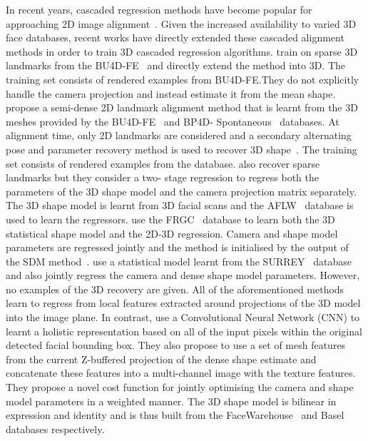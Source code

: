 In recent years, cascaded regression methods have become popular for approaching
2D image alignment~\cite{xiong2013supervised,cao2014face,ren2014face,kazemi2014one}.
Given the increased availability to varied 3D face databases, recent works have
directly extended these cascaded alignment methods in order to train 3D cascaded
regression algorithms. \citet{tulyakov2015regressing} train on sparse 3D
landmarks from the BU4D-FE~\cite{yin2008high} and directly extend the method
\citet{kazemi2014one} into 3D. The training set consists of rendered examples
from BU4D-FE.\@ They do not explicitly handle the camera projection and instead
estimate it from the mean shape.
\citet{Jeni:2015ft} propose a semi-dense 2D landmark alignment method that is
learnt from the 3D meshes provided by the BU4D-FE~\cite{yin2008high} and BP4D-
Spontaneous~\cite{Zhang:2014id} databases. At alignment time, only 2D landmarks
are considered and a secondary alternating pose and parameter recovery method is
used to recover 3D shape~\cite{lie2006alignment}. The training set consists of
rendered examples from the database.
\citet{Jourabloo:2015dw} also recover sparse landmarks but they consider a two-
stage regression to regress both the parameters of the 3D shape model and the
camera projection matrix separately. The 3D shape model is learnt from 3D facial
scans and the AFLW~\cite{kostinger2011annotated} database is used to learn the
regressors.
\citet{zhu2015discriminative} use the FRGC~\cite{phillips2005overview} database
to learn both the 3D statistical shape model and the 2D-3D regression. Camera
and shape model parameters are regressed jointly and the method is initialised
by the output of the SDM method~\cite{xiong2013supervised}.
\citet{Huber:2015bs} use a statistical model learnt from the
SURREY~\cite{Huber:F5Dca9zy} database and also jointly regress the camera and
dense shape model parameters. However, no examples of the 3D recovery are given.
All of the aforementioned methods learn to regress from local features extracted
around projections of the 3D model into the image plane. In contrast,
\citet{Zhu:2015ur} use a Convolutional Neural Network (CNN) to learnt a holistic
representation based on all of the input pixels within the original detected
facial bounding box. They also propose to use a set of mesh features from the
current Z-buffered projection of the dense shape estimate and concatenate these
features into a multi-channel image with the texture features. They propose a
novel cost function for jointly optimising the camera and shape model parameters
in a weighted manner. The 3D shape model is bilinear in expression and identity
and is thus built from the FaceWarehouse~\cite{Cao:2014gy} and
Basel~\cite{paysan20093d} databases respectively.

